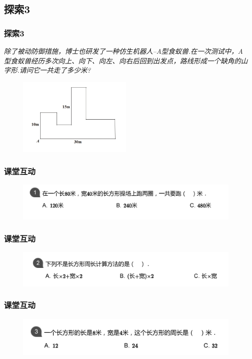 \subsection{探索3}
\begin{frame}
    \frametitle{探索3}
    \textit{除了被动防御措施，博士也研发了一种仿生机器人--A型食蚁兽.在一次测试中，A型食蚁兽经历多次向上、向下、向左、向右后回到出发点，路线形成一个缺角的山字形.请问它一共走了多少米?}
    \begin{figure}[H] 
        \centering
        \includegraphics[width=0.5\textwidth]{./pics/Chapter_1/tansuo3.png}
    \end{figure}
\end{frame}

\begin{frame}
    \frametitle{课堂互动}
    \begin{figure}[H] 
        \centering
        \includegraphics[width=1\textwidth]{./pics/Chapter_1/kthd1.png}
    \end{figure}
\end{frame}

\begin{frame}
    \frametitle{课堂互动}
    \begin{figure}[H] 
        \centering
        \includegraphics[width=1\textwidth]{./pics/Chapter_1/kthd2.png}
    \end{figure}
\end{frame}

\begin{frame}
    \frametitle{课堂互动}
    \begin{figure}[H] 
        \centering
        \includegraphics[width=1\textwidth]{./pics/Chapter_1/kthd3.png}
    \end{figure}
\end{frame}


